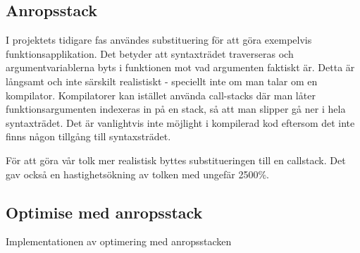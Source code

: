 \documentclass[Rapport]{subfiles}
\begin{document}
\subsection{Anropsstack}

I projektets tidigare fas användes substituering för att göra exempelvis funktionsapplikation.
Det betyder att syntaxträdet traverseras och argumentvariablerna byts i funktionen
mot vad argumenten faktiskt är. Detta är långsamt och inte särskilt realistiskt - 
speciellt inte om man talar om en kompilator. Kompilatorer kan istället använda call-stacks
där man låter funktionsargumenten indexeras in på en stack, så att man slipper
gå ner i hela syntaxträdet. Det är vanlightvis inte möjlight i kompilerad kod eftersom
det inte finns någon tillgång till syntaxsträdet.

För att göra vår tolk mer realistisk byttes substitueringen till en callstack. 
Det gav också en hastighetsökning av tolken med ungefär 2500\%.

\subsection{Optimise med anropsstack}

Implementationen av optimering med anropsstacken 

\end{document}
